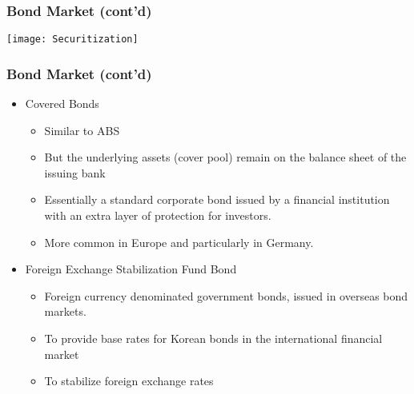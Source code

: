 \documentclass[10pt]{beamer}
\begin{document}
	
	
	\begin{frame}
		\frametitle{Bond Market (cont'd)}
		
		\begin{center}
			\texttt{[image: Securitization]}
		\end{center}
		
	\end{frame}
	
	
	
	
	\begin{frame}
		\frametitle{Bond Market (cont'd)}
		
		\begin{itemize} \vspace{5pt} \itemsep10pt
			
			\item Covered Bonds
			\begin{itemize} \vspace{5pt} \itemsep10pt
				\item Similar to ABS
				\item But the underlying assets (cover pool) remain on the balance sheet of the issuing bank
				\item Essentially a standard corporate bond issued by a financial institution with an extra layer of protection for investors. 
				\item More common in Europe and particularly in Germany.
			\end{itemize}	
			
			\item Foreign Exchange Stabilization Fund Bond
			\begin{itemize} \vspace{5pt} \itemsep10pt
				\item Foreign currency denominated government bonds, issued in overseas bond markets.
				\item To provide base rates for Korean bonds in the international financial market
				\item To stabilize foreign exchange rates 
			\end{itemize}	
			
			
		\end{itemize}
		
	\end{frame}
	
\end{document}

